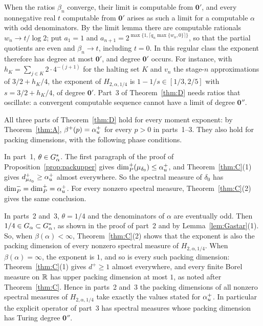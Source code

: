 \begin{remark}
When the ratios $\beta_n$ converge, their limit is computable from $\mathbf 0'$, and every nonnegative real $t$ computable from $\mathbf 0'$ arises as such a limit for a computable $\alpha$ with odd denominators. By the limit lemma there are computable rationals $w_n\to t/\log2$; put $a_1=1$ and $a_{n+1}=2^{\max\{1,\lceil q_n\max\{w_n,0\}\rceil\}}$, so that the partial quotients are even and $\beta_n\to t$, including $t=0$. In this regular class the exponent therefore has degree at most $\mathbf 0'$, and degree $\mathbf 0'$ occurs. For instance, with $h_K=\sum_{j\in K}2\cdot4^{-(j+1)}$ for the halting set $K$ and $v_n$ the stage-$n$ approximations of $3/2+h_K/4$, the exponent of $H_{2,\alpha,1/4}$ is $1-1/s\in[1/3,2/5]$ with $s=3/2+h_K/4$, of degree $\mathbf 0'$. Part~3 of Theorem~\ref{thm:D} needs ratios that oscillate: a convergent computable sequence cannot have a limit of degree $\mathbf 0''$.
\end{remark}

\begin{remark}
All three parts of Theorem~\ref{thm:D} hold for every moment exponent: by Theorem~\ref{thm:A}, $\beta^+(p)=\alpha_u^+$ for every $p>0$ in parts~1--3. They also hold for packing dimensions, with the following phase conditions.

In part~1, $\theta\in G_\alpha^*$. The first paragraph of the proof of Proposition~\ref{prop:packupper} gives $\dim_P^+(\mu_{\delta_0})\le\alpha_u^+$, and Theorem~\ref{thm:C}(1) gives $d^+_{\mu_{\delta_0}}\ge\alpha_u^+$ almost everywhere. So the spectral measure of $\delta_0$ has $\dim_P^-=\dim_P^+=\alpha_u^+$. For every nonzero spectral measure, Theorem~\ref{thm:C}(2) gives the same conclusion.

In parts~2 and~3, $\theta=1/4$ and the denominators of $\alpha$ are eventually odd. Then $1/4\in G_\alpha\subset G_\alpha^*$, as shown in the proof of part~2 and by Lemma~\ref{lem:Gastar}(1). So, when $\beta(\alpha)<\infty$, Theorem~\ref{thm:C}(2) shows that the exponent is also the packing dimension of every nonzero spectral measure of $H_{2,\alpha,1/4}$. When $\beta(\alpha)=\infty$, the exponent is $1$, and so is every such packing dimension: Theorem~\ref{thm:C}(1) gives $d^+\ge1$ almost everywhere, and every finite Borel measure on $\mathbb R$ has upper packing dimension at most $1$, as noted after Theorem~\ref{thm:C}. Hence in parts~2 and~3 the packing dimensions of all nonzero spectral measures of $H_{2,\alpha,1/4}$ take exactly the values stated for $\alpha_u^+$. In particular the explicit operator of part~3 has spectral measures whose packing dimension has Turing degree $\mathbf 0''$.
\end{remark}


